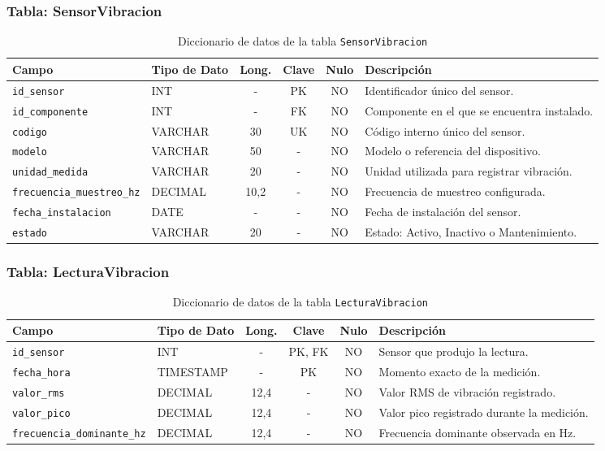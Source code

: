 \documentclass[11pt,a4paper]{article}
\begin{document}
\subsubsection{Tabla: SensorVibracion}
\begin{table}[H]
\centering
\small
\caption{Diccionario de datos de la tabla \texttt{SensorVibracion}}
\begin{tabular}{|l|l|c|c|c|p{5.1cm}|}
\hline
\textbf{Campo} & \textbf{Tipo de Dato} & \textbf{Long.} & \textbf{Clave} & \textbf{Nulo} & \textbf{Descripción} \\ \hline
\texttt{id\_sensor} & INT & - & PK & NO & Identificador único del sensor. \\ \hline
\texttt{id\_componente} & INT & - & FK & NO & Componente en el que se encuentra instalado. \\ \hline
\texttt{codigo} & VARCHAR & 30 & UK & NO & Código interno único del sensor. \\ \hline
\texttt{modelo} & VARCHAR & 50 & - & NO & Modelo o referencia del dispositivo. \\ \hline
\texttt{unidad\_medida} & VARCHAR & 20 & - & NO & Unidad utilizada para registrar vibración. \\ \hline
\texttt{frecuencia\_muestreo\_hz} & DECIMAL & 10,2 & - & NO & Frecuencia de muestreo configurada. \\ \hline
\texttt{fecha\_instalacion} & DATE & - & - & NO & Fecha de instalación del sensor. \\ \hline
\texttt{estado} & VARCHAR & 20 & - & NO & Estado: Activo, Inactivo o Mantenimiento. \\ \hline
\end{tabular}
\end{table}

\subsubsection{Tabla: LecturaVibracion}
\begin{table}[H]
\centering
\small
\caption{Diccionario de datos de la tabla \texttt{LecturaVibracion}}
\begin{tabular}{|l|l|c|c|c|p{5.1cm}|}
\hline
\textbf{Campo} & \textbf{Tipo de Dato} & \textbf{Long.} & \textbf{Clave} & \textbf{Nulo} & \textbf{Descripción} \\ \hline
\texttt{id\_sensor} & INT & - & PK, FK & NO & Sensor que produjo la lectura. \\ \hline
\texttt{fecha\_hora} & TIMESTAMP & - & PK & NO & Momento exacto de la medición. \\ \hline
\texttt{valor\_rms} & DECIMAL & 12,4 & - & NO & Valor RMS de vibración registrado. \\ \hline
\texttt{valor\_pico} & DECIMAL & 12,4 & - & NO & Valor pico registrado durante la medición. \\ \hline
\texttt{frecuencia\_dominante\_hz} & DECIMAL & 12,4 & - & NO & Frecuencia dominante observada en Hz. \\ \hline
\end{tabular}
\end{table}
\end{document}
